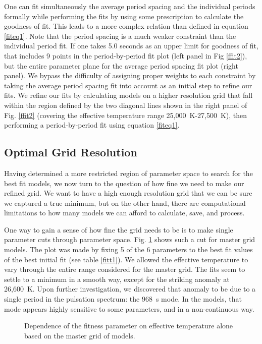 \documentclass[12pt,preprint]{aastex}
\begin{document}
One can fit simultaneously the average period spacing and the individual periods 
formally while performing the fits by using some prescription to calculate the goodness of fit. 
This leads to a more complex relation than defined in equation \ref{fiteq1}. 
Note that the period spacing is a much weaker constraint than the individual period fit. 
If one takes 5.0 seconds as an upper limit for goodness of fit, that includes 9 points in the 
period-by-period fit plot (left panel in Fig \ref{ffit2}), but the entire parameter plane 
for the average period spacing fit plot (right panel). We bypass the difficulty of 
assigning proper weights to each constraint by taking the average period spacing fit into 
account as an initial step to refine our fits. We refine our fits by calculating models on 
a higher resolution grid that fall within the region defined by the two diagonal lines shown 
in the right panel of Fig. \ref{ffit2} (covering the effective temperature range 25,000~K-27,500~K), then performing a period-by-period fit using 
equation \ref{fiteq1}.

\subsection{Optimal Grid Resolution}
\label{refinedfits}


Having determined a more restricted region of parameter space to search for 
the best fit models, we now turn to the question of how fine we need to 
make our refined grid. We want to have a high enough resolution grid that 
we can be sure we captured a true minimum, but on the other hand, there are 
computational limitations to how many models we can afford to calculate, 
save, and process.

One way to gain a sense of how fine the grid needs to be is to make single 
parameter cuts through parameter space. Fig.  \ref{ffit3} shows such a cut 
for master grid models. The plot was made by fixing 5 of the 6 parameters 
to the best fit values of the best initial fit (see table \ref{fitt1}).
We allowed the effective temperature to vary through the entire range 
considered for the master grid. The fits seem to settle to a minimum in a 
smooth way, except for the striking anomaly at 26,600~K. Upon further 
investigation, we discovered that anomaly to be due to a single period in 
the pulsation spectrum: the 968~s mode. In the models, that mode appears 
highly sensitive to some parameters, and in a non-continuous way.

\begin{figure}
\caption{
Dependence of the fitness parameter on effective temperature alone based on 
the master grid of models. \label{ffit3}
}
\end{figure}
\end{document}
